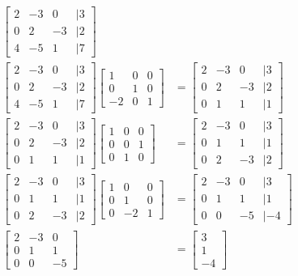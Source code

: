 \documentclass[paper=a4, fontsize=10pt]{scrartcl} %
\begin{document}
\begin{align*}
\begin{bmatrix}
			2 & -3 & 0 &| 3 \\
			0 & 2 & -3 &| 2 \\
			4 & -5 & 1 &| 7
		\end{bmatrix}
		\\
		\begin{bmatrix}
			2 & -3 & 0 &| 3 \\
			0 & 2 & -3 &| 2 \\
			4 & -5 & 1 &| 7
		\end{bmatrix}
		\begin{bmatrix}
			1 & 0 & 0 \\
			0 & 1 & 0 \\
			-2 & 0 & 1
		\end{bmatrix}
		&=
		\begin{bmatrix}
			2 & -3 & 0 &| 3 \\
			0 & 2 & -3 &| 2 \\
			0 & 1 & 1 &| 1
		\end{bmatrix}
		\\
		\begin{bmatrix}
			2 & -3 & 0 &| 3 \\
			0 & 2 & -3 &| 2 \\
			0 & 1 & 1 &| 1
		\end{bmatrix}
		\begin{bmatrix}
			1 & 0 & 0 \\
			0 & 0 & 1 \\
			0 & 1 & 0
		\end{bmatrix}
		&=
		\begin{bmatrix}
			2 & -3 & 0 &| 3 \\
			0 & 1 & 1 &| 1 \\
			0 & 2 & -3 &| 2
		\end{bmatrix}
		\\
		\begin{bmatrix}
			2 & -3 & 0 &| 3 \\
			0 & 1 & 1 &| 1 \\
			0 & 2 & -3 &| 2
		\end{bmatrix}
		\begin{bmatrix}
			1 & 0 & 0 \\
			0 & 1 & 0 \\
			0 & -2 & 1
		\end{bmatrix}
		&=
		\begin{bmatrix}
			2 & -3 & 0 &| 3 \\
			0 & 1 & 1 &| 1 \\
			0 & 0 & -5 &| -4
		\end{bmatrix}
		\\
		\begin{bmatrix}
			2 & -3 & 0 \\
			0 & 1 & 1 \\
			0 & 0 & -5
		\end{bmatrix}
		&=
		\begin{bmatrix}
			3 \\ 1 \\ -4
		\end{bmatrix}
	\end{align*}
\end{document}

